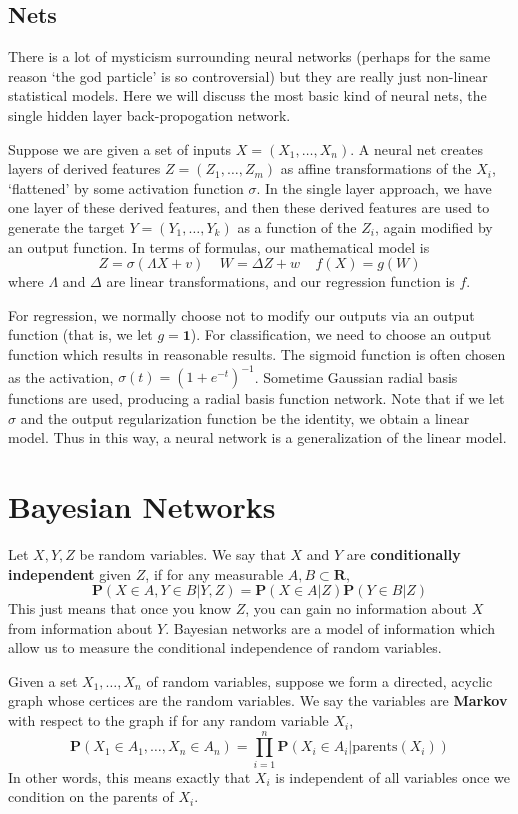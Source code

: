 \section{Nets}

There is a lot of mysticism surrounding neural networks (perhaps for the same reason `the god particle' is so controversial) but they are really just non-linear statistical models. Here we will discuss the most basic kind of neural nets, the single hidden layer back-propogation network.

Suppose we are given a set of inputs $X = (X_1, \dots, X_n)$. A neural net creates layers of derived features $Z = (Z_1, \dots, Z_m)$ as affine transformations of the $X_i$, `flattened' by some activation function $\sigma$. In the single layer approach, we have one layer of these derived features, and then these derived features are used to generate the target $Y = (Y_1, \dots, Y_k)$ as a function of the $Z_i$, again modified by an output function. In terms of formulas, our mathematical model is
%
\[ Z = \sigma(\Lambda X + v)\ \ \ \ \ W = \Delta Z + w\ \ \ \ \ f(X) = g(W) \]
%
where $\Lambda$ and $\Delta$ are linear transformations, and our regression function is $f$.

For regression, we normally choose not to modify our outputs via an output function (that is, we let $g = \mathbf{1}$). For classification, we need to choose an output function which results in reasonable results. The sigmoid function is often chosen as the activation, $\sigma(t) = (1 + e^{-t})^{-1}$. Sometime Gaussian radial basis functions are used, producing a radial basis function network. Note that if we let $\sigma$ and the output regularization function be the identity, we obtain a linear model. Thus in this way, a neural network is a generalization of the linear model.

\chapter{Bayesian Networks}

Let $X,Y,Z$ be random variables. We say that $X$ and $Y$ are {\bf conditionally independent} given $Z$, if for any measurable $A,B \subset \mathbf{R}$,
%
\[ \mathbf{P}(X \in A,Y \in B|Y,Z) = \mathbf{P}(X \in A|Z)\mathbf{P}(Y \in B|Z) \]
%
This just means that once you know $Z$, you can gain no information about $X$ from information about $Y$. Bayesian networks are a model of information which allow us to measure the conditional independence of random variables.

Given a set $X_1, \dots, X_n$ of random variables, suppose we form a directed, acyclic graph whose certices are the random variables. We say the variables are {\bf Markov} with respect to the graph if for any random variable $X_i$,
%
\[ \mathbf{P}(X_1 \in A_1, \dots, X_n \in A_n) = \prod_{i = 1}^n \mathbf{P}(X_i \in A_i | \text{parents}(X_i)) \]
%
In other words, this means exactly that $X_i$ is independent of all variables once we condition on the parents of $X_i$.

